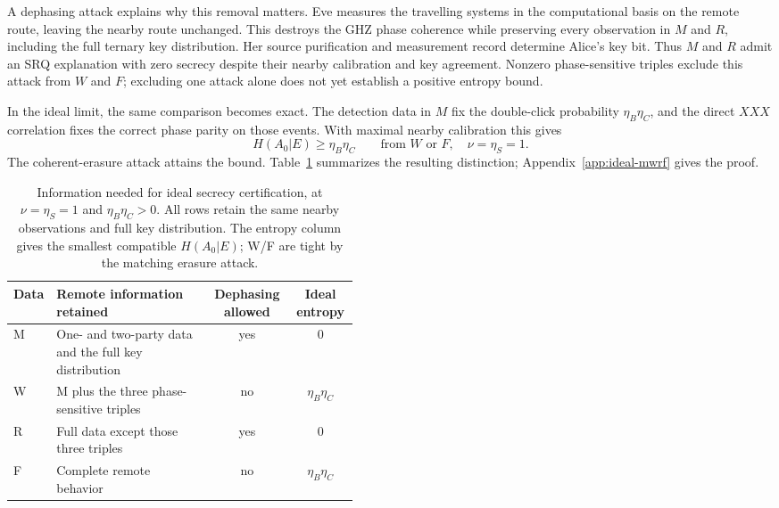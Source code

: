 \documentclass[aps,10pt,onecolumn,prx,superscriptaddress,longbibliography,nofootinbib]{revtex4-2}
\begin{document}
A dephasing attack explains why this removal matters. Eve measures the travelling systems in the computational basis on the remote route, leaving the nearby route unchanged. This destroys the GHZ phase coherence while preserving every observation in \(M\) and \(R\), including the full ternary key distribution. Her source purification and measurement record determine Alice's key bit. Thus \(M\) and \(R\) admit an SRQ explanation with zero secrecy despite their nearby calibration and key agreement. Nonzero phase-sensitive triples exclude this attack from \(W\) and \(F\); excluding one attack alone does not yet establish a positive entropy bound.

In the ideal limit, the same comparison becomes exact. The detection data in \(M\) fix the double-click probability \(\eta_B\eta_C\), and the direct \(XXX\) correlation fixes the correct phase parity on those events. With maximal nearby calibration this gives
\begin{equation}
 H(A_0|E)\geq\eta_B\eta_C\qquad\text{from }W\text{ or }F,
 \quad \nu=\eta_S=1.
 \label{eq:ideal-mwrf-secrecy}
\end{equation}
The coherent-erasure attack attains the bound. Table~\ref{tab:mwrf} summarizes the resulting distinction; Appendix~\ref{app:ideal-mwrf} gives the proof.

\begin{table}[htbp]
\caption{Information needed for ideal secrecy certification, at \(\nu=\eta_S=1\) and \(\eta_B\eta_C>0\). All rows retain the same nearby observations and full key distribution. The entropy column gives the smallest compatible \(H(A_0|E)\); W/F are tight by the matching erasure attack.}
\label{tab:mwrf}
\begin{ruledtabular}
\begin{tabular}{lp{0.45\linewidth}cc}
Data & Remote information retained & Dephasing allowed & Ideal entropy\\
\hline
M & One- and two-party data and the full key distribution & yes & \(0\)\\
W & M plus the three phase-sensitive triples & no & \(\eta_B\eta_C\)\\
R & Full data except those three triples & yes & \(0\)\\
F & Complete remote behavior & no & \(\eta_B\eta_C\)\\
\end{tabular}
\end{ruledtabular}
\end{table}
\end{document}
